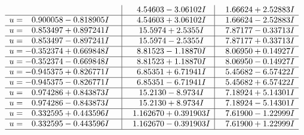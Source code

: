 \documentclass[1p]{elsarticle_modified}
\theoremstyle{definition}
\begin{document}
$$\begin{array}{c|c|c}
 & \phantom{-}4.54603 - 3.06102 I & \phantom{-}1.66624 + 2.52883 I \\ \hline\begin{aligned}
u &= \phantom{-}0.900058 - 0.818905 I\end{aligned}
 & \phantom{-}4.54603 + 3.06102 I & \phantom{-}1.66624 - 2.52883 I \\ \hline\begin{aligned}
u &= \phantom{-}0.853497 + 0.897241 I\end{aligned}
 & \phantom{-}15.5974 + 2.5355 I & \phantom{-}7.87177 - 0.33713 I \\ \hline\begin{aligned}
u &= \phantom{-}0.853497 - 0.897241 I\end{aligned}
 & \phantom{-}15.5974 - 2.5355 I & \phantom{-}7.87177 + 0.33713 I \\ \hline\begin{aligned}
u &= -0.352374 + 0.669848 I\end{aligned}
 & \phantom{-}8.81523 - 1.18870 I & \phantom{-}8.06950 + 0.14927 I \\ \hline\begin{aligned}
u &= -0.352374 - 0.669848 I\end{aligned}
 & \phantom{-}8.81523 + 1.18870 I & \phantom{-}8.06950 - 0.14927 I \\ \hline\begin{aligned}
u &= -0.945375 + 0.826771 I\end{aligned}
 & \phantom{-}6.85351 + 6.71941 I & \phantom{-}5.45682 - 6.57422 I \\ \hline\begin{aligned}
u &= -0.945375 - 0.826771 I\end{aligned}
 & \phantom{-}6.85351 - 6.71941 I & \phantom{-}5.45682 + 6.57422 I \\ \hline\begin{aligned}
u &= \phantom{-}0.974286 + 0.843873 I\end{aligned}
 & \phantom{-}15.2130 - 8.9734 I & \phantom{-}7.18924 + 5.14301 I \\ \hline\begin{aligned}
u &= \phantom{-}0.974286 - 0.843873 I\end{aligned}
 & \phantom{-}15.2130 + 8.9734 I & \phantom{-}7.18924 - 5.14301 I \\ \hline\begin{aligned}
u &= \phantom{-}0.332595 + 0.443596 I\end{aligned}
 & \phantom{-}1.162670 + 0.391903 I & \phantom{-}7.61900 - 1.22999 I \\ \hline\begin{aligned}
u &= \phantom{-}0.332595 - 0.443596 I\end{aligned}
 & \phantom{-}1.162670 - 0.391903 I & \phantom{-}7.61900 + 1.22999 I\\
 \hline 
 \end{array}$$\newpage
\end{document}
